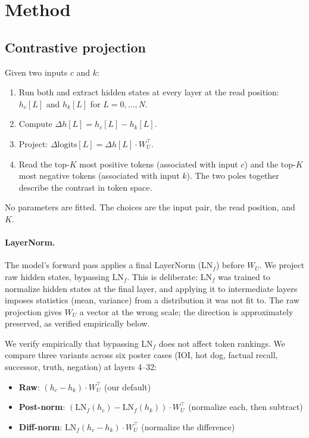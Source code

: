 \documentclass[11pt]{article}
\newcommand{\dhh}{\Delta h}
\newcommand{\WU}{W_U}
\begin{document}
\section{Method}

\subsection{Contrastive projection}

Given two inputs $c$ and $k$:

\begin{enumerate}[leftmargin=*]
\item Run both and extract hidden states at every layer at the read position:
   $h_c[L]$ and $h_k[L]$ for $L = 0, \dots, N$.
\item Compute $\dhh[L] = h_c[L] - h_k[L]$.
\item Project: $\Delta\text{logits}[L] = \dhh[L] \cdot \WU^\top$.
\item Read the top-$K$ most positive tokens (associated with input $c$) and the
   top-$K$ most negative tokens (associated with input $k$). The two poles
   together describe the contrast in token space.
\end{enumerate}

No parameters are fitted. The choices are the input pair, the read position, and $K$.

\paragraph{LayerNorm.} The model's forward pass applies a final LayerNorm ($\text{LN}_f$) before
$\WU$. We project raw hidden states, bypassing $\text{LN}_f$. This is deliberate: $\text{LN}_f$
was trained to normalize hidden states at the final layer, and applying it to
intermediate layers imposes statistics (mean, variance) from a distribution it
was not fit to. The raw projection gives $\WU$ a vector at the wrong scale; the
direction is approximately preserved, as verified empirically below.

We verify empirically that bypassing $\text{LN}_f$ does not affect token rankings. We
compare three variants across six poster cases (IOI, hot dog, factual recall,
successor, truth, negation) at layers 4--32:

\begin{itemize}[leftmargin=*]
\item \textbf{Raw}: $(h_c - h_k) \cdot \WU^\top$ (our default)
\item \textbf{Post-norm}: $(\text{LN}_f(h_c) - \text{LN}_f(h_k)) \cdot \WU^\top$ (normalize each, then subtract)
\item \textbf{Diff-norm}: $\text{LN}_f(h_c - h_k) \cdot \WU^\top$ (normalize the difference)
\end{itemize}
\end{document}

